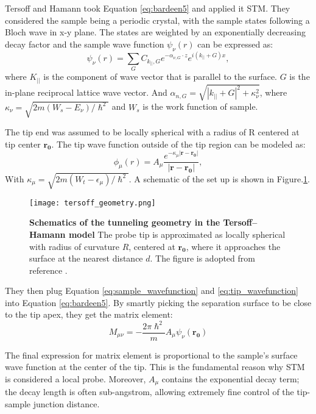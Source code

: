 Tersoff and Hamann took Equation \ref{eq:bardeen5} and applied it \ac{STM}. They considered the sample being a periodic crystal, with the sample states following a Bloch wave in x-y plane. The states are weighted by an exponentially decreasing decay factor and the sample wave function $\psi_{\nu}(r)$ can be expressed as:
\begin{equation}
	\label{eq:sample_wavefunction}
	\psi_{\nu}(r) = \sum_G C_{k_{||},G} e^{-\alpha_{\nu,G}\cdot z }e^{i(k_{||}+G)x},
\end{equation}
where $K_{||}$ is the component of wave vector that is parallel to the surface. $G$ is the in-plane reciprocal lattice wave vector. And $\alpha_{n,G} = \sqrt{|k_{||}+G|^2 + \kappa_{\nu}^2}$, where $\kappa_{\nu} = \sqrt{2m(W_s - E_{\nu})/\hslash^2}$ and $W_s$ is the work function of sample. 

The tip end was assumed to be locally spherical with a radius of R centered at tip center $\mathbf{r_0}$. The tip wave function outside of the tip region can be modeled as:
\begin{equation}
	\label{eq:tip_wavefunction}
	\phi_{\mu}(r) = A_{\mu} \frac{e^{-\kappa_{\mu} |\mathbf{r-r_0}|}}{|\mathbf{r-r_0}|},
\end{equation}
With $\kappa_{\mu} = \sqrt{2m(W_t-\epsilon_{\mu})/\hslash^2}$. A schematic of the set up is shown in Figure.\ref{fig:tersoff}. 
\begin{figure}
	\centering
	\texttt{[image: tersoff\_geometry.png]}
	\caption[\textbf{Schematics of the tunneling geometry in the Tersoff–Hamann model}]{\textbf{Schematics of the tunneling geometry in the Tersoff–Hamann model} The probe tip is approximated as locally spherical with radius of curvature $R$, centered at $\mathbf{r_0}$, where it approaches the surface at the nearest distance $d$. The figure is adopted from reference \cite{tersoffTheoryScanningTunneling1985}.}
	\label{fig:tersoff}
\end{figure}

They then plug Equation \ref{eq:sample_wavefunction} and \ref{eq:tip_wavefunction} into Equation \ref{eq:bardeen5}. By smartly picking the separation surface to be close to the tip apex, they get the matrix element: 
\begin{equation}
	\label{eq:matrixelement_final}
	M_{\mu \nu} = -\frac{2\pi\hslash^2}{m}A_{\mu}\psi_{\nu}(\mathbf{r_0})
\end{equation}

The final expression for matrix element is proportional to the sample's surface wave function at the center of the tip. This is the fundamental reason why \ac{STM} is considered a local probe. Moreover, $A_{\mu}$ contains the exponential decay term; the decay length is often sub-angstrom, allowing extremely fine control of the tip-sample junction distance. 

